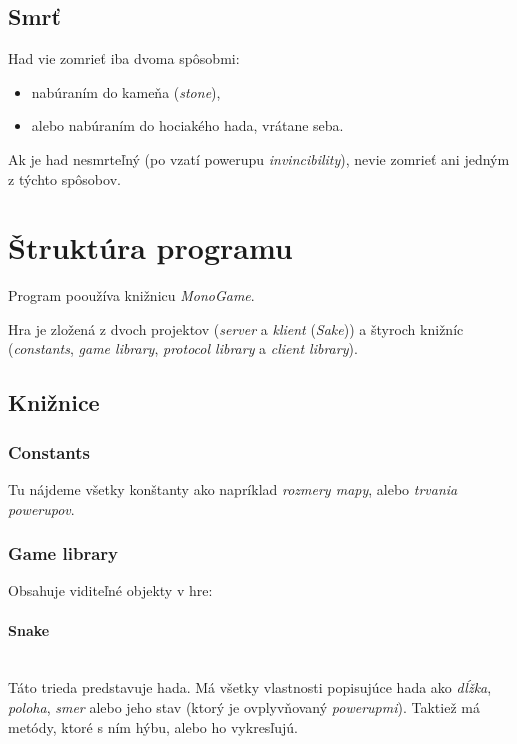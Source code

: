 \documentclass{article}
\begin{document}
\subsection{Smrť}
Had vie zomrieť iba dvoma spôsobmi:
\begin{itemize}
    \item nabúraním do kameňa (\textit{stone}),
    \item alebo nabúraním do hociakého hada, vrátane seba.
\end{itemize}

Ak je had nesmrteľný (po vzatí powerupu \textit{invincibility}), nevie zomrieť ani jedným z týchto spôsobov.

\pagebreak
\section{Štruktúra programu}

Program pooužíva knižnicu \textit{MonoGame}.

Hra je zložená z dvoch projektov (\textit{server} a \textit{klient} (\textit{Sake})) a štyroch knižníc (\textit{constants}, \textit{game library}, \textit{protocol library} a \textit{client library}).

\subsection{Knižnice}

\subsubsection{Constants}

Tu nájdeme všetky konštanty ako napríklad \textit{rozmery mapy}, alebo \textit{trvania powerupov}.

\subsubsection{Game library}

Obsahuje viditeľné objekty v hre:

\paragraph{Snake}\mbox{} \\

Táto trieda predstavuje hada. Má všetky vlastnosti popisujúce hada ako \textit{dĺžka}, \textit{poloha}, \textit{smer} alebo jeho stav (ktorý je ovplyvňovaný \textit{powerupmi}). Taktiež má metódy, ktoré s ním hýbu, alebo ho vykresľujú.
\end{document}
